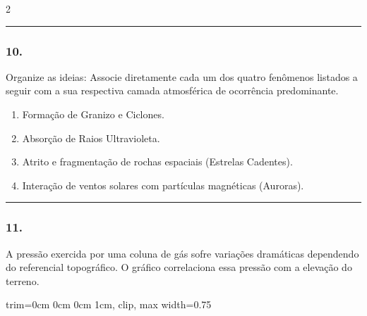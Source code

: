 \documentclass[twoside, 10pt, a4paper]{article}
\newlength{\espacoPreQuestao}
\newlength{\espacoQuestao}
\newlength{\espacoAlt}
\begin{document}
\begin{multicols*}{2}
\noindent\textcolor{CorLinha}{\rule{\linewidth}{0.5pt}} 
\par\vspace{\espacoPreQuestao}
\subsubsection*{10.} Organize as ideias: Associe diretamente cada um dos quatro fenômenos listados a seguir com a sua respectiva camada atmosférica de ocorrência predominante. 

\begin{enumerate}[label=\Roman*., itemsep=\espacoAlt]
\item Formação de Granizo e Ciclones.
\item Absorção de Raios Ultravioleta.
\item Atrito e fragmentação de rochas espaciais (Estrelas Cadentes).
\item Interação de ventos solares com partículas magnéticas (Auroras).
\end{enumerate}
\par\vspace{\espacoQuestao}

\noindent\textcolor{CorLinha}{\rule{\linewidth}{0.5pt}} 
\par\vspace{\espacoPreQuestao}
\subsubsection*{11.} A pressão exercida por uma coluna de gás sofre variações dramáticas dependendo do referencial topográfico. O gráfico correlaciona essa pressão com a elevação do terreno.

\begin{center}
\begin{adjustbox}{trim=0cm 0cm 0cm 1cm, clip, max width={0.75\linewidth}}
\end{adjustbox}
\end{center}
\end{multicols*}
\end{document}
